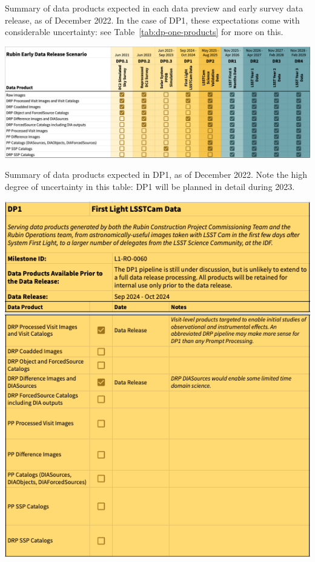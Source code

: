 \begin{table}
\caption{Summary of data products expected in each data preview and early survey data release, as of December 2022.
In the case of DP1, these expectations come with considerable uncertainty: see Table~\ref{tab:dp-one-products} for more on this.}
\label{tab:summary}
\includegraphics[width=\linewidth]{figures/DPR-summary}
\end{table}

\begin{table}
\caption{Summary of data products expected in DP1, as of December 2022.
Note the high degree of uncertainty in this table: DP1 will be planned in detail during 2023.}
\label{tab:dp-one-products}
\includegraphics[width=\linewidth]{figures/DP1-products}
\end{table}


